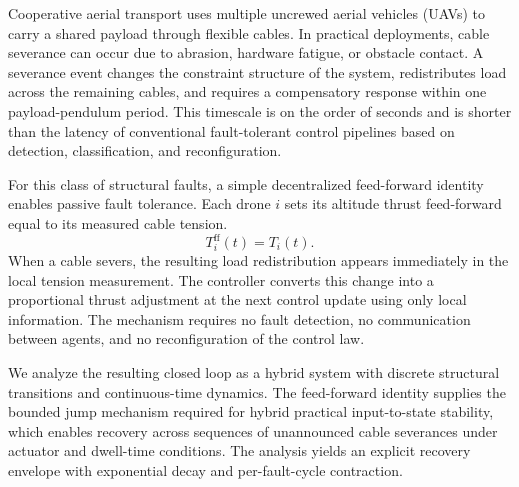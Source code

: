 
Cooperative aerial transport uses multiple uncrewed aerial vehicles (UAVs) to carry a shared payload through flexible cables. In practical deployments, cable severance can occur due to abrasion, hardware fatigue, or obstacle contact. A severance event changes the constraint structure of the system, redistributes load across the remaining cables, and requires a compensatory response within one payload-pendulum period. This timescale is on the order of seconds and is shorter than the latency of conventional fault-tolerant control pipelines based on detection, classification, and reconfiguration.

For this class of structural faults, a simple decentralized feed-forward identity enables passive fault tolerance. Each drone $i$ sets its altitude thrust feed-forward equal to its measured cable tension. 
\begin{equation}
  T_i^{\mathrm{ff}}(t) = T_i(t).
\end{equation}
When a cable severs, the resulting load redistribution appears immediately in the local tension measurement. The controller converts this change into a proportional thrust adjustment at the next control update using only local information. The mechanism requires no fault detection, no communication between agents, and no reconfiguration of the control law.

We analyze the resulting closed loop as a hybrid system with discrete structural transitions and continuous-time dynamics. The feed-forward identity supplies the bounded jump mechanism required for hybrid practical input-to-state stability, which enables recovery across sequences of unannounced cable severances under actuator and dwell-time conditions. The analysis yields an explicit recovery envelope with exponential decay and per-fault-cycle contraction.

